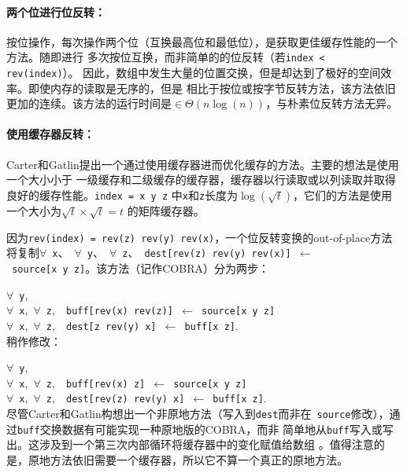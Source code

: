 \documentclass[10pt]{article}
\begin{document}
\begin{CJK*}{UTF8}{gbsn}
\paragraph{两个位进行位反转：}
按位操作，每次操作两个位（互换最高位和最低位），是获取更佳缓存性能的一个方法。随即进行
多次按位互换\cite{perez:place}，而非简单的的位反转（若{\tt index < rev(index)}）。
因此，数组中发生大量的位置交换，但是却达到了极好的空间效率。即使内存的读取是无序的，但是
相比于按位或按字节反转方法，该方法依旧更加的连续。该方法的运行时间是$\in
\Theta(n \log(n))$，与朴素位反转方法无异。

\paragraph{使用缓存器反转：}
Carter和Gatlin提出一个通过使用缓存器进而优化缓存的方法。主要的想法是使用一个大小小于
一级缓存和二级缓存的缓存器，缓存器以行读取或以列读取并取得良好的缓存性能。{\tt index = x y z}
中{\tt x}和{\tt z}长度为$\log(\sqrt{t})$，它们的方法是使用一个大小为$\sqrt{t} \times \sqrt{t} = t$ \cite{carter:towards}的矩阵缓存器。

因为{\tt rev(index) = rev(z) rev(y) rev(x)}，一个位反转变换的out-of-place方法
将复制$\forall$~{\tt x}、~$\forall$~{\tt y}、~$\forall$~{\tt z}、~{\tt dest[rev(z)~rev(y)~rev(x)]~$\gets$~source[x~y~z]}。该方法（记作COBRA\cite{carter:towards}）分为两步：

\noindent $\forall$~{\tt y},\\
\mbox{} \quad $\forall$~{\tt x},~$\forall$~{\tt z},~{\tt
  buff[rev(x)~rev(z)]~$\gets$~source[x~y~z]}\\
\mbox{} \quad $\forall$~{\tt x},~$\forall$~{\tt z},~{\tt
  dest[z~rev(y)~x]~$\gets$~buff[x~z]}.\\

\noindent 稍作修改：

\noindent $\forall$~{\tt y},\\
\mbox{} \quad $\forall$~{\tt x},~$\forall$~{\tt z},~{\tt
  buff[rev(x)~z]~$\gets$~source[x~y~z]}\\
\mbox{} \quad $\forall$~{\tt x},~$\forall$~{\tt z},~{\tt
  dest[rev(z)~rev(y)~x]~$\gets$~buff[x~z]}.\\

尽管Carter和Gatlin构想出一个非原地方法（写入到{\tt dest}而非在{\tt
source}修改），通过{\tt buff}交换数据有可能实现一种原地版的COBRA，而非
简单地从{\tt buff}写入或写出。这涉及到一个第三次内部循环将缓存器中的变化赋值给数组
。值得注意的是，原地方法依旧需要一个缓存器，所以它不算一个真正的原地方法。


\end{CJK*}
\end{document}
